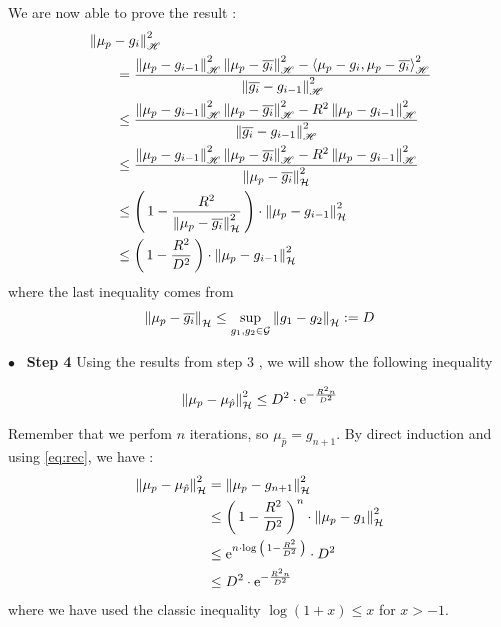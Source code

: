 We are now able to prove the result :
\begin{align*}
&\left\| \mu_p-g_i \right\|_{ \mathscr { H }} ^ { 2 } \\ &\qquad= \frac { \left\| \mu_p-g_{i-1} \right\|_{ \mathscr { H }} ^ { 2 } \left\| \mu_p-\overline{g_i} \right\|_{ \mathscr { H }} ^ { 2 } - \left\langle \mu_p-g_i , \mu_p-\overline{g_i} \right\rangle_{ \mathscr { H }} ^ { 2 } } { \left\| \overline{g_i}-g_{i-1} \right\|_{ \mathscr { H }} ^ { 2 } }\\
&\qquad\leq \frac { \left\| \mu_p-g_{i-1} \right\|_{ \mathscr { H }} ^ { 2 } \left\| \mu_p-\overline{g_i} \right\|_{ \mathscr { H }} ^ { 2 } - R^2 \left\| \mu _ { p } - g _ { i - 1 } \right\| _ { \mathscr { H } }^2 } { \left\| \overline{g_i}-g_{i-1} \right\|_{ \mathscr { H }} ^ { 2 } }\\
&\qquad\leq \frac { \left\| \mu_p-g_{i-1} \right\|_{ \mathscr { H }} ^ { 2 } \left\| \mu_p-\overline{g_i} \right\|_{ \mathscr { H }} ^ { 2 } - R^2 \left\| \mu _ { p } - g _ { i - 1 } \right\| _ { \mathscr { H } }^2 } { \norme{\mu_p-\overline{g_i}}^2 }\\
&\qquad \leq \prt{1-\frac{R^2}{\norme{\mu_p-\overline{g_i}}^2}}\cdot \norme{\mu_p-g_{i-1}}^2\\
&\qquad \leq \prt{1-\frac{R^2}{D^2}}\cdot \norme{\mu_p-g_{i-1}}^2
\end{align*}
where the last inequality comes from
\begin{equation*}
  \norme{\mu_p-\overline{g_i}} \leq \sup_{g_1, g_2 \in \G}   \norme{g_1-g_2} :=D
\end{equation*}

  {$\bullet$~\normalfont\bfseries\color{myorange!90!black} Step 4 }
  Using the results from step $3$ , we will show the following inequality

  \begin{boxtheorem}
\begin{equation}
  \norme{\mu_p-\mu_{\hat{p}}}^2 \leq D^2 \cdot \e^{-\frac{R^2 n}{D^2}}
\end{equation}
  \end{boxtheorem}

Remember that we perfom $n$ iterations, so $\mu_{\hat{p}}=g_{n+1}$.
By direct induction and using \eqref{eq:rec}, we have :
\begin{align*}
  \norme{\mu_p-\mu_{\hat{p}}}^2 &= \norme{\mu_p-g_{n+1}}^2 \\
  &\leq \prt{1-\frac{R^2}{D^2}}^n \cdot \norme{\mu_p-g_{1}}^2\\
  &\leq \e^{n \cdot \log{\prt{1-\frac{R^2}{D^2}}}} \cdot D^2\\
  &\leq D^2 \cdot \e^{-\frac{R^2 n}{D^2}}
\end{align*}
where we have used the classic inequality $\log(1+x) \leq x$ for $x>-1$.

